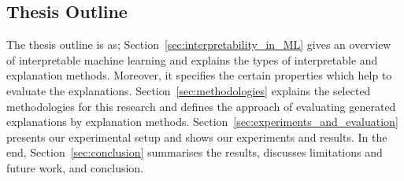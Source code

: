 \documentclass[english]{tktltiki2}
\theoremstyle{definition}
\theoremstyle{remark}
\begin{document}
%

%


\subsection{Thesis Outline} %
The thesis outline is as; Section~\ref{sec:interpretability_in_ML} gives an overview of interpretable machine learning and explains the types of interpretable and explanation methods. Moreover, it specifies the certain properties which help to evaluate the explanations. Section~\ref{sec:methodologies} explains the selected methodologies for this research and defines the approach of evaluating generated explanations by explanation methods. Section~\ref{sec:experiments_and_evaluation} presents our experimental setup and shows our experiments and results. In the end, Section~\ref{sec:conclusion} summarises the results, discusses limitations and future work, and conclusion.
\end{document}
